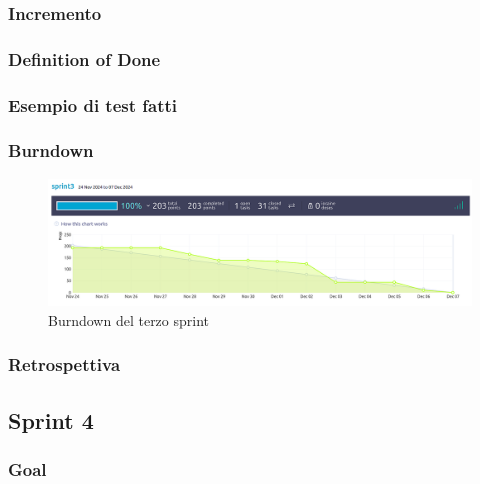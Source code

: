 \documentclass{article}
\begin{document}
\subsubsection{Incremento}

\subsubsection{Definition of Done}

\subsubsection{Esempio di test fatti}

\subsubsection{Burndown}
\begin{figure}[H]
    \centering
    \includegraphics[width=1\textwidth]{burndown3}
    \caption{Burndown del terzo sprint}
    \label{fig:burndown3}
\end{figure}

\subsubsection{Retrospettiva}

\subsection{Sprint 4}

\subsubsection{Goal}
\end{document}
